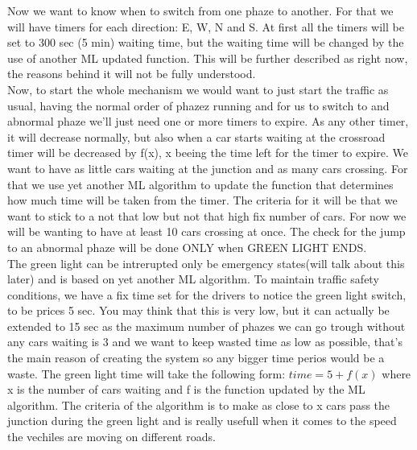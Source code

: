 \documentclass[17pt]{article}
\begin{document}
\indent \indent
Now we want to know when to switch from one phaze to another. For that we will have
timers for each direction: E, W, N and S. At first all the timers will be set to 
300 sec (5 min) waiting time, but the waiting time will be changed by the use of
another ML updated function. This will be further described as right now, the reasons
behind it will not be fully understood.\\
\indent \indent
Now, to start the whole mechanism we would want to just start the traffic as usual, 
having the normal order of phazez running and for us to switch to and abnormal 
phaze we'll just need one or more timers to expire. As any other timer, it will decrease normally,
but also when a car starts waiting at the crossroad timer will be decreased by f(x), x beeing 
the time left for the timer to expire. We want to have as little cars waiting at the junction
and as many cars crossing. For that we use yet another ML algorithm to update the function that 
determines how much time will be taken from the timer. The criteria for it will be that 
we want to stick to a not that low but not that high fix number of cars. For now we will be wanting
to have at least 10 cars crossing at once. The check for the jump to an abnormal phaze
will be done ONLY when GREEN LIGHT ENDS.\\
\indent \indent
The green light can be intrerupted only be emergency states(will talk about this later)
and is based on yet another ML algorithm. To maintain traffic safety conditions,
we have a fix time set for the drivers to notice the green light switch, to be prices
5 sec. You may think that this is very low, but it can actually be extended to 15 sec as 
the maximum number of phazes we can go trough without any cars waiting is 3 and we want to
keep wasted time as low as possible, that's the main reason of creating the system so any
bigger time perios would be a waste. The green light time will take the following form:
\begin{math}
    time = 5 + f(x)
\end{math}
where x is the number of cars waiting and f is the function updated by the ML algorithm.
The criteria of the algorithm is to make as close to x cars pass the junction during the 
green light and is really usefull when it comes to the speed the vechiles are moving on 
different roads.

\pagebreak

\begin{lstlisting}[language = C++]

\end{lstlisting}
\pagebreak
\end{document}
